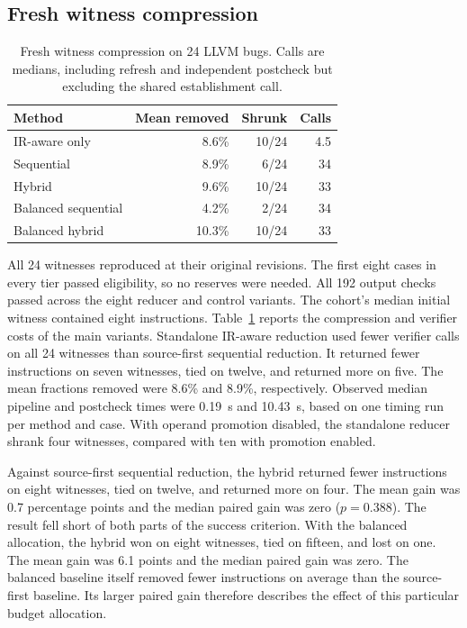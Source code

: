 \documentclass[conference]{IEEEtran}
\begin{document}
\subsection{Fresh witness compression}

\begin{table}[t]
\caption{Fresh witness compression on 24 LLVM bugs. Calls are medians, including refresh and independent postcheck but excluding the shared establishment call.}
\label{tab:fresh-reducers}
\centering\footnotesize
\begin{tabular}{@{}lrrr@{}}
\toprule
Method & Mean removed & Shrunk & Calls \\
\midrule
IR-aware only & 8.6\% & 10/24 & 4.5 \\
Sequential & 8.9\% & 6/24 & 34 \\
Hybrid & 9.6\% & 10/24 & 33 \\
Balanced sequential & 4.2\% & 2/24 & 34 \\
Balanced hybrid & 10.3\% & 10/24 & 33 \\
\bottomrule
\end{tabular}
\end{table}

All 24 witnesses reproduced at their original revisions. The first eight cases in every tier passed eligibility, so no reserves were needed. All 192 output checks passed across the eight reducer and control variants. The cohort's median initial witness contained eight instructions. Table~\ref{tab:fresh-reducers} reports the compression and verifier costs of the main variants. Standalone IR-aware reduction used fewer verifier calls on all 24 witnesses than source-first sequential reduction. It returned fewer instructions on seven witnesses, tied on twelve, and returned more on five. The mean fractions removed were 8.6\% and 8.9\%, respectively. Observed median pipeline and postcheck times were 0.19~s and 10.43~s, based on one timing run per method and case. With operand promotion disabled, the standalone reducer shrank four witnesses, compared with ten with promotion enabled.

Against source-first sequential reduction, the hybrid returned fewer instructions on eight witnesses, tied on twelve, and returned more on four. The mean gain was 0.7 percentage points and the median paired gain was zero ($p=0.388$). The result fell short of both parts of the success criterion. With the balanced allocation, the hybrid won on eight witnesses, tied on fifteen, and lost on one. The mean gain was 6.1 points and the median paired gain was zero. The balanced baseline itself removed fewer instructions on average than the source-first baseline. Its larger paired gain therefore describes the effect of this particular budget allocation.
\end{document}
